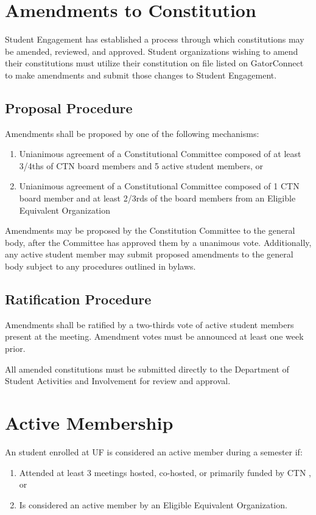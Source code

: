 \documentclass{article}
\def\clubname{CTN }
\begin{document}
\section{Amendments to Constitution}
Student Engagement has established a process through which constitutions may be amended, reviewed, and approved. Student organizations wishing to amend their constitutions must utilize their constitution on file listed on GatorConnect to make amendments and submit those changes to Student Engagement.

\subsection{Proposal Procedure}
Amendments shall be proposed by one of the following mechanisms:
\begin{enumerate}
	\item Unianimous agreement of a Constitutional Committee composed of at least 3/4ths of \clubname board members and 5 active student members, or
	\item Unianimous agreement of a Constitutional Committee composed of 1 \clubname board member and at least 2/3rds of the board members from an Eligible Equivalent Organization
\end{enumerate}

Amendments may be proposed by the Constitution Committee to the general body, after the Committee has approved them by a unanimous vote. Additionally, any active student member may submit proposed amendments to the general body subject to any procedures outlined in bylaws.

\subsection{Ratification Procedure}
Amendments shall be ratified by a two-thirds vote of active student members present at the meeting. Amendment votes must be announced at least one week prior. 

All amended constitutions must be submitted directly to the Department of Student Activities and Involvement for review and approval. 

\section{Active Membership}
An student enrolled at UF is considered an active member during a semester if:
\begin{enumerate}
	\item Attended at least 3 meetings hosted, co-hosted, or primarily funded by \clubname, or
	\item Is considered an active member by an Eligible Equivalent Organization.
\end{enumerate}
\end{document}
